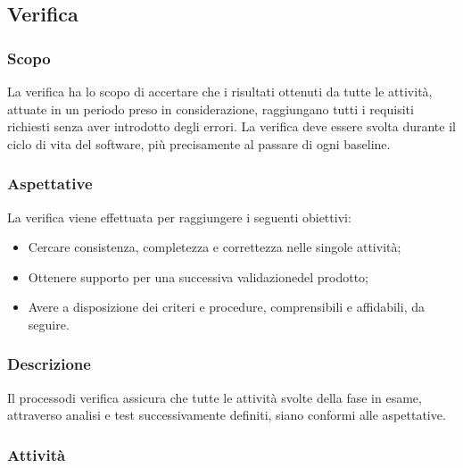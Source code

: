 \subsection{Verifica}
\subsubsection{Scopo}
La verifica ha lo scopo di accertare che i risultati ottenuti da tutte le attività, attuate in un periodo preso in considerazione, raggiungano tutti i requisiti richiesti senza aver introdotto degli errori. La verifica deve essere svolta durante il ciclo di vita del software, più precisamente al passare di ogni baseline\glo.
\subsubsection{Aspettative}
La verifica viene effettuata per raggiungere i seguenti obiettivi:
\begin{itemize}
	\item Cercare consistenza, completezza e correttezza nelle singole attività;
	\item Ottenere supporto per una successiva validazione\glosp del prodotto\glo;
	\item Avere a disposizione dei criteri e procedure, comprensibili e affidabili, da seguire.
\end{itemize}
\subsubsection{Descrizione}
Il processo\glosp di verifica assicura che tutte le attività svolte della fase in esame, attraverso analisi e test successivamente definiti, siano conformi alle aspettative.
\subsubsection{Attività}
